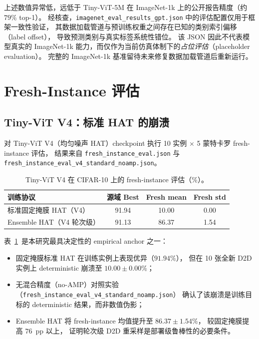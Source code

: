 上述数值异常低，远低于 Tiny-ViT-5M 在 ImageNet-1k 上的公开报告精度（约 $79\%$ top-1）。
经核查，\texttt{imagenet\_eval\_results\_gpt.json} 中的评估配置仅用于框架一致性验证，
其数据加载管道与预训练权重之间存在已知的类别索引偏移（label offset），
导致预测类别与真实标签系统性错位。
该 JSON 因此不代表模型真实的 ImageNet-1k 能力，而仅作为当前仿真体制下的\emph{占位评估}（placeholder evaluation）。
完整的 ImageNet-1k 基准留待未来修复数据加载管道后重新运行。

\section{Fresh-Instance 评估}

\subsection{Tiny-ViT V4：标准 HAT 的崩溃}

对 Tiny-ViT V4（均匀噪声 HAT）checkpoint 执行 10 实例 $\times$ 5 蒙特卡罗 fresh-instance 评估，
结果来自 \texttt{fresh\_instance\_eval.json} 与 \texttt{fresh\_instance\_eval\_v4\_standard\_noamp.json}。

\begin{table}[htbp]
\centering
\caption{Tiny-ViT V4 在 CIFAR-10 上的 fresh-instance 评估（\%）。}
\label{tab:fresh-instance-v4}
\begin{tabular}{@{}lccc@{}}
\toprule
\textbf{训练协议} & \textbf{源域 Best} & \textbf{Fresh mean} & \textbf{Fresh std} \\
\midrule
标准固定掩膜 HAT（V4） & 91.94 & 10.00 & 0.00 \\
Ensemble HAT（V4 轮次级） & 91.13 & 86.37 & 1.54 \\
\bottomrule
\end{tabular}
\end{table}

表~\ref{tab:fresh-instance-v4}~是本研究最具决定性的 empirical anchor 之一：
\begin{itemize}
    \item 固定掩膜标准 HAT 在训练实例上表现优异（$91.94\%$），
    但在 10 张全新 D2D 实例上 deterministic 崩溃至 $10.00\pm0.00\%$；
    \item 无混合精度（no-AMP）对照实验（\texttt{fresh\_instance\_eval\_v4\_standard\_noamp.json}）
    确认了该崩溃是训练目标的 deterministic 结果，而非数值伪影；
    \item Ensemble HAT 将 fresh-instance 均值提升至 $86.37\pm1.54\%$，
    较固定掩膜提高 $76$~pp 以上，
    证明轮次级 D2D 重采样是部署级鲁棒性的必要条件。
\end{itemize}

